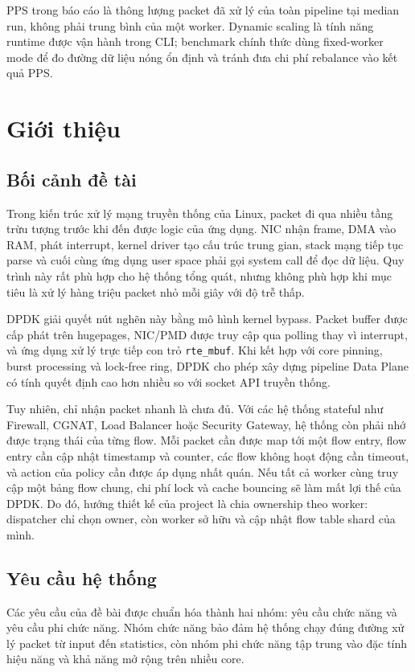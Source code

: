 \documentclass[12pt,a4paper,twoside]{report}
\newcommand{\code}[1]{\texttt{#1}}
\begin{document}
PPS trong báo cáo là thông lượng packet đã xử lý của toàn pipeline tại median
run, không phải trung bình của một worker. Dynamic scaling là tính năng runtime
được vận hành trong CLI; benchmark chính thức dùng fixed-worker mode để đo
đường dữ liệu nóng ổn định và tránh đưa chi phí rebalance vào kết quả PPS.
\endgroup

\newpage
\tableofcontents
\newpage
\listoffigures
\newpage
\listoftables

\newpage
{}

\chapter{Giới thiệu}

\section{Bối cảnh đề tài}
Trong kiến trúc xử lý mạng truyền thống của Linux, packet đi qua nhiều tầng
trừu tượng trước khi đến được logic của ứng dụng. NIC nhận frame, DMA vào RAM,
phát interrupt, kernel driver tạo cấu trúc trung gian, stack mạng tiếp tục parse
và cuối cùng ứng dụng user space phải gọi system call để đọc dữ liệu. Quy trình
này rất phù hợp cho hệ thống tổng quát, nhưng không phù hợp khi mục tiêu là
xử lý hàng triệu packet nhỏ mỗi giây với độ trễ thấp.

DPDK giải quyết nút nghẽn này bằng mô hình kernel bypass. Packet buffer được
cấp phát trên hugepages, NIC/PMD được truy cập qua polling thay vì interrupt,
và ứng dụng xử lý trực tiếp con trỏ \code{rte\_mbuf}. Khi kết hợp với core
pinning, burst processing và lock-free ring, DPDK cho phép xây dựng pipeline
Data Plane có tính quyết định cao hơn nhiều so với socket API truyền thống.

Tuy nhiên, chỉ nhận packet nhanh là chưa đủ. Với các hệ thống stateful như
Firewall, CGNAT, Load Balancer hoặc Security Gateway, hệ thống còn phải nhớ
được trạng thái của từng flow. Mỗi packet cần được map tới một flow entry, flow
entry cần cập nhật timestamp và counter, các flow không hoạt động cần timeout,
và action của policy cần được áp dụng nhất quán. Nếu tất cả worker cùng truy
cập một bảng flow chung, chi phí lock và cache bouncing sẽ làm mất lợi thế của
DPDK. Do đó, hướng thiết kế của project là chia ownership theo worker: dispatcher
chỉ chọn owner, còn worker sở hữu và cập nhật flow table shard của mình.

\section{Yêu cầu hệ thống}
Các yêu cầu của đề bài được chuẩn hóa thành hai nhóm: yêu cầu chức năng và yêu
cầu phi chức năng. Nhóm chức năng bảo đảm hệ thống chạy đúng đường xử lý packet
từ input đến statistics, còn nhóm phi chức năng tập trung vào đặc tính hiệu năng
và khả năng mở rộng trên nhiều core.
\end{document}
